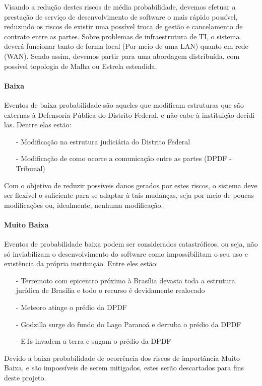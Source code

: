 \documentclass[12pt,a4paper]{report}
\begin{document}
Visando a redução destes riscos de média probabilidade, devemos efetuar a prestação de serviço de desenvolvimento de software o mais rápido possível, reduzindo os riscos de existir uma possível troca de gestão e cancelamento de contrato entre as partes.
Sobre problemas de infraestrutura de TI, o sistema deverá funcionar tanto de forma local (Por meio de uma LAN) quanto em rede (WAN). Sendo assim, devemos partir para uma abordagem distribuída, com possível topologia de Malha ou Estrela estendida.

\paragraph{Baixa} Eventos de baixa probabilidade são aqueles que modificam estruturas que são externas à Defensoria Pública do Distrito Federal, e não cabe à instituição decidi-las. Dentre elas estão:
\begin{itemize}
\item [-] Modificação na estrutura judiciária do Distrito Federal
\item [-] Modificação de como ocorre a comunicação entre as partes (DPDF - Tribunal)
\end{itemize}

Com o objetivo de reduzir possíveis danos gerados por estes riscos, o sistema deve ser flexível o suficiente para se adaptar à tais mudanças, seja por meio de poucas modificações ou, idealmente, nenhuma modificação.

\paragraph{Muito Baixa} Eventos de probabilidade baixa podem ser considerados catastróficos, ou seja, não só inviabilizam o desenvolvimento do software como impossibilitam o seu uso e existência da própria instituição. Entre eles estão:
\begin{itemize}
\item [-] Terremoto com epicentro próximo à Brasília devasta toda a estrutura jurídica de Brasília e todo o recurso é devidamente realocado
\item [-] Meteoro atinge o prédio da DPDF
\item [-] Godzilla surge do fundo do Lago Paranoá e derruba o prédio da DPDF
\item [-] ETs invadem a terra e sugam o prédio da DPDF
\end{itemize}


Devido a baixa probabilidade de ocorrência dos riscos de importância Muito Baixa, e são impossíveis de serem mitigados, estes serão descartados para fins deste projeto. 



\end{document}
